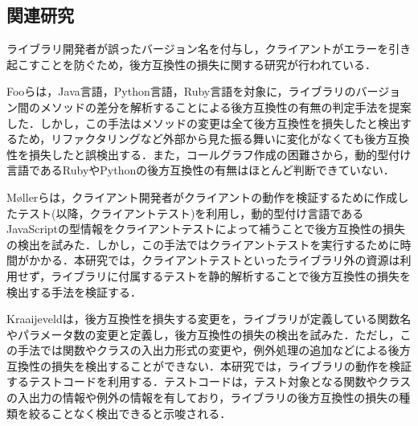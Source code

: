 \documentclass[submit]{ipsj}
\begin{document}
\subsection{関連研究}
ライブラリ開発者が誤ったバージョン名を付与し，クライアントがエラーを引き起こすことを防ぐため，後方互換性の損失に関する研究が行われている\cite{How_Do_Api_Evolve}\cite{A_Study_on_Behavioral}\cite{How_to_Break_an_API}．

Fooらは，Java言語，Python言語，Ruby言語を対象に，ライブラリのバージョン間のメソッドの差分を解析することによる後方互換性の有無の判定手法を提案した\cite{foo}．しかし，この手法はメソッドの変更は全て後方互換性を損失したと検出するため，リファクタリングなど外部から見た振る舞いに変化がなくても後方互換性を損失したと誤検出する．また，コールグラフ作成の困難さから，動的型付け言語であるRubyやPythonの後方互換性の有無はほとんど判断できていない．

M{\o}llerらは，クライアント開発者がクライアントの動作を検証するために作成したテスト(以降，クライアントテスト)を利用し，動的型付け言語であるJavaScriptの型情報をクライアントテストによって補うことで後方互換性の損失の検出を試みた\cite{type-regression-testing}\cite{model-based-testing}．しかし，この手法ではクライアントテストを実行するために時間がかかる．本研究では，クライアントテストといったライブラリ外の資源は利用せず，ライブラリに付属するテストを静的解析することで後方互換性の損失を検出する手法を検証する．

Kraaijeveldは，後方互換性を損失する変更を，ライブラリが定義している関数名やパラメータ数の変更と定義し，後方互換性の損失の検出を試みた\cite{detecting-breaking-changes-in-js-apis}．ただし，この手法では関数やクラスの入出力形式の変更や，例外処理の追加などによる後方互換性の損失を検出することができない．本研究では，ライブラリの動作を検証するテストコードを利用する．テストコードは，テスト対象となる関数やクラスの入出力の情報や例外の情報を有しており，ライブラリの後方互換性の損失の種類を絞ることなく検出できると示唆される．


\end{document}
